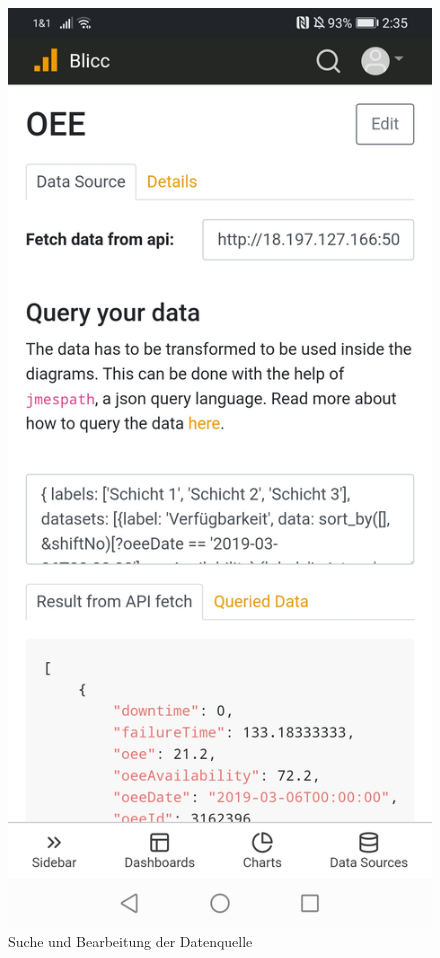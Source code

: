 \begin{figure}[h]
    \includegraphics[scale=0.15]{img/android/DataSource}
    \caption{Suche und Bearbeitung der Datenquelle}
    \label{figure:sucheundbearbeitungderdatenquelle}
\end{figure}


